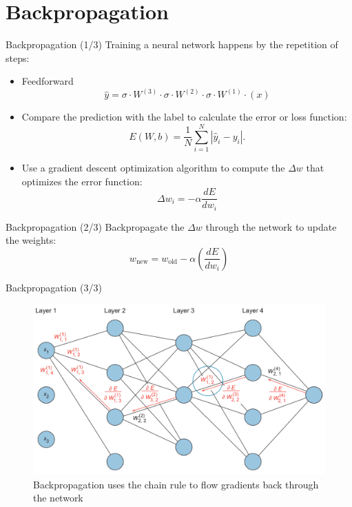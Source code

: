 \documentclass{beamer}
\begin{document}
\section{Backpropagation}
\begin{frame}{Backpropagation (1/3)}
	Training a neural network happens by the repetition of steps:
	\begin{itemize}
		\item<2-> Feedforward
		\begin{equation*}
			\hat{y} = \sigma \cdot W^{(3)} \cdot \sigma \cdot W^{(2)} \cdot \sigma \cdot W^{(1)} \cdot (x)
		\end{equation*} 
	\item<3-> Compare the prediction with the label to calculate the error or loss function:
		\begin{equation*}
			E(W,b) = \frac{1}{N} \sum_{i=1}^N{\left| \hat{y}_i - y_i \right|}.
		\end{equation*}			
	\item<4-> Use a gradient descent optimization algorithm to compute the $\Delta w$ that optimizes the error function:
		\begin{equation*}
			\Delta w_i = - \alpha \frac{dE}{dw_i}
		\end{equation*}
	\end{itemize}
\end{frame}

\begin{frame}{Backpropagation (2/3)}
		Backpropagate the $\Delta w$ through the network to update the weights:
		\begin{equation*}
			w_{\text{new}} = w_{\text{old}} - \alpha \left( \frac{dE}{dw_i} \right)
		\end{equation*}
\end{frame}

\begin{frame}{Backpropagation (3/3)}
	\begin{figure}[ht]
	\centering
	\includegraphics[scale=0.2]{images/chain-rule}
	\caption{Backpropagation uses the chain rule to flow gradients back through the network}
\end{figure}	
\end{frame}
\end{document}
